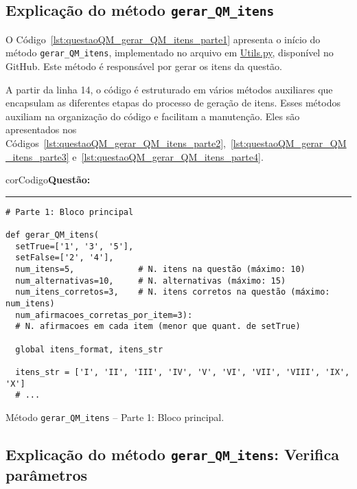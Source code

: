 \subsection{Explicação do método \texttt{gerar\_QM\_itens}}\label{sec:metodo_Gerar_QM_itens}

O Código~\ref{lst:questaoQM_gerar_QM_itens_parte1} apresenta o início do método \verb|gerar_QM_itens|, implementado no arquivo em \href{https://github.com/fzampirolli/mctest/blob/master/topic/Utils.py}{Utils.py}, disponível no GitHub. Este método é responsável por gerar os itens da questão.

A partir da linha 14, o código é estruturado em vários métodos auxiliares que encapsulam as diferentes etapas do processo de geração de itens. Esses métodos auxiliam na organização do código e facilitam a manutenção. Eles são apresentados nos Códigos~\ref{lst:questaoQM_gerar_QM_itens_parte2},~\ref{lst:questaoQM_gerar_QM_itens_parte3} e~\ref{lst:questaoQM_gerar_QM_itens_parte4}.

\begin{listing}[!ht]
  \begin{myboxCode}{corCodigo}{\textbf{Questão: }}\vspace{3mm}
  \hrule
  \begin{verbatim}
# Parte 1: Bloco principal

def gerar_QM_itens(
  setTrue=['1', '3', '5'], 
  setFalse=['2', '4'], 
  num_itens=5,             # N. itens na questão (máximo: 10)
  num_alternativas=10,     # N. alternativas (máximo: 15)
  num_itens_corretos=3,    # N. itens corretos na questão (máximo: num_itens)
  num_afirmacoes_corretas_por_item=3): 
  # N. afirmacoes em cada item (menor que quant. de setTrue)
    
  global itens_format, itens_str

  itens_str = ['I', 'II', 'III', 'IV', 'V', 'VI', 'VII', 'VIII', 'IX', 'X']
  # ...
\end{verbatim}
\end{myboxCode}
\caption{Método \texttt{gerar\_QM\_itens} -- Parte 1: Bloco principal.}
\label{lst:questaoQM_gerar_QM_itens_parte1}
\end{listing}

\subsection{Explicação do método \texttt{gerar\_QM\_itens}: Verifica parâmetros}

